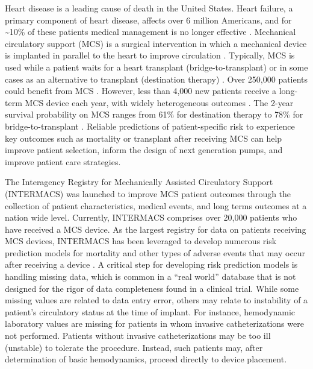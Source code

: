 \documentclass{article}
\begin{document}
\label{sec:introduction}

\linenumbers
\doublespacing

Heart disease is a leading cause of death in the United States. Heart
failure, a primary component of heart disease, affects over 6 million
Americans, and for \textasciitilde10\% of these patients medical
management is no longer effective
\cite{benjamin2017heart,national2017health}. Mechanical circulatory
support (MCS) is a surgical intervention in which a mechanical device is
implanted in parallel to the heart to improve circulation
\cite{patel2014contemporary}. Typically, MCS is used while a patient
waits for a heart transplant (bridge-to-transplant) or in some cases as
an alternative to transplant (destination therapy)
\cite{slaughter2009advanced}. Over 250,000 patients could benefit from
MCS \cite{miller2011left}. However, less than 4,000 new patients receive
a long-term MCS device each year, with widely heterogeneous outcomes
\cite{stewart2011keeping}. The 2-year survival probability on MCS ranges
from 61\% for destination therapy to 78\% for bridge-to-transplant
\cite{patel2014contemporary}. Reliable predictions of patient-specific
risk to experience key outcomes such as mortality or transplant after
receiving MCS can help improve patient selection, inform the design of
next generation pumps, and improve patient care strategies.

The Interagency Registry for Mechanically Assisted Circulatory Support
(INTERMACS) was launched to improve MCS patient outcomes through the
collection of patient characteristics, medical events, and long terms
outcomes at a nation wide level. Currently, INTERMACS comprises over
20,000 patients who have received a MCS device. As the largest registry
for data on patients receiving MCS devices, INTERMACS has been leveraged
to develop numerous risk prediction models for mortality and other types
of adverse events that may occur after receiving a device
\cite{hsich2012should, cotts2014predictors, eckman2011survival, kirklin2017eighth, kormos2019society, Adamo950}.
A critical step for developing risk prediction models is handling
missing data, which is common in a ``real world'' database that is not
designed for the rigor of data completeness found in a clinical trial.
While some missing values are related to data entry error, others may
relate to instability of a patient's circulatory status at the time of
implant. For instance, hemodynamic laboratory values are missing for
patients in whom invasive catheterizations were not performed. Patients
without invasive catheterizations may be too ill (unstable) to tolerate
the procedure. Instead, such patients may, after determination of basic
hemodynamics, proceed directly to device placement.
\end{document}
